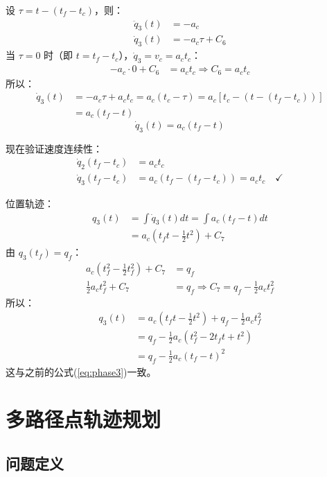 \documentclass[12pt,a4paper]{article}
\begin{document}
设 $\tau = t - (t_f - t_c)$，则：
\begin{align*}
    \ddot{q}_3(t) &= -a_c \\
    \dot{q}_3(t) &= -a_c \tau + C_6
\end{align*}
当 $\tau = 0$ 时（即 $t = t_f - t_c$），$\dot{q}_3 = v_c = a_c t_c$：
\begin{align*}
    -a_c \cdot 0 + C_6 &= a_c t_c \Rightarrow C_6 = a_c t_c
\end{align*}
所以：
\begin{align*}
    \dot{q}_3(t) &= -a_c \tau + a_c t_c = a_c (t_c - \tau) = a_c [t_c - (t - (t_f - t_c))] \\
    &= a_c (t_f - t)
\end{align*}
\begin{equation}
\boxed{
\dot{q}_3(t) = a_c (t_f - t)
}
\label{eq:velocity_phase3_corrected}
\end{equation}

现在验证速度连续性：
\begin{align*}
    \dot{q}_2(t_f - t_c) &= a_c t_c \\
    \dot{q}_3(t_f - t_c) &= a_c (t_f - (t_f - t_c)) = a_c t_c \quad \checkmark
\end{align*}

位置轨迹：
\begin{align*}
    q_3(t) &= \int \dot{q}_3(t) dt = \int a_c (t_f - t) dt \\
    &= a_c (t_f t - \frac{1}{2}t^2) + C_7
\end{align*}
由 $q_3(t_f) = q_f$：
\begin{align*}
    a_c (t_f^2 - \frac{1}{2}t_f^2) + C_7 &= q_f \\
    \frac{1}{2} a_c t_f^2 + C_7 &= q_f \Rightarrow C_7 = q_f - \frac{1}{2} a_c t_f^2
\end{align*}
所以：
\begin{align*}
    q_3(t) &= a_c (t_f t - \frac{1}{2}t^2) + q_f - \frac{1}{2} a_c t_f^2 \\
    &= q_f - \frac{1}{2} a_c (t_f^2 - 2t_f t + t^2) \\
    &= q_f - \frac{1}{2} a_c (t_f - t)^2
\end{align*}
这与之前的公式(\ref{eq:phase3})一致。

\section{多路径点轨迹规划}

\subsection{问题定义}
\end{document}
